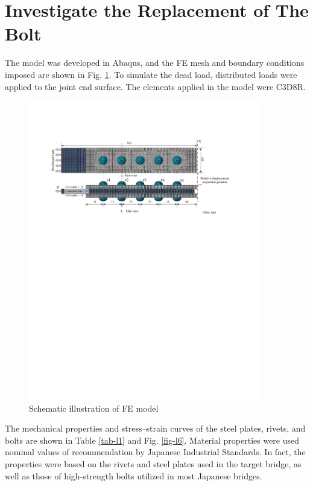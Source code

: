 \section{Investigate the Replacement of The Bolt}

The model was developed in Abaqus, and the FE mesh and boundary conditions imposed are shown in Fig. \ref{fig-l5}. To simulate the dead load, distributed loads were applied to the joint end surface. The elements applied in the model were  \ac{C3D8R}.

\begin{figure}[htbp]
    \centering
    \includegraphics[width=0.9\textwidth]{imgs/ch4/fig-l5.pdf}
    \caption{Schematic illustration of FE model}
    \label{fig-l5}
\end{figure}

The mechanical properties and stress–strain curves of the steel plates, rivets, and bolts are shown in Table \ref{tab-l1} and Fig. \ref{fig-l6}. Material properties were used nominal values of recommendation by Japanese Industrial Standards. In fact, the properties were based on the rivets and steel plates used in the target bridge, as well as those of high-strength bolts utilized in most Japanese bridges.

